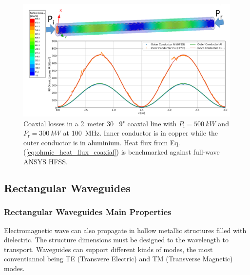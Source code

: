 \begin{figure}
	\centering
	\includegraphics[width=1.0\linewidth]{figures/chap3/coaxial_losses}
	\caption{Coaxial losses in a 2~meter 30~\si{\Omega} 9" coaxial line with $P_\mathrm{i}=500~\si{kW}$ and  $P_\mathrm{r}=300~\si{kW}$ at 100~\si{MHz}. Inner conductor is in copper while the outer conductor is in aluminium. Heat flux from Eq.(\ref{eq:ohmic_heat_flux_coaxial}) is benchmarked against full-wave ANSYS HFSS.}
	\label{fig:coaxial_losses}
\end{figure}


\subsection{Rectangular Waveguides}\label{sec:rectangular_waveguide}
\subsubsection{Rectangular Waveguides Main Properties}
Electromagnetic wave can also propagate in hollow metallic structures filled with dielectric. The structure dimensions must be designed to the wavelength to transport. Waveguides can support different kinds of modes, the most conventiannol being TE (Transvere Electric) and TM (Transverse Magnetic) modes. 

